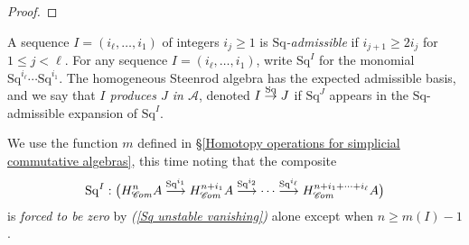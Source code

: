 \documentclass[11pt]{amsart} \renewcommand{\baselinestretch}{1.2}
\theoremstyle{plain}
\numberwithin{equation}{section} %
\theoremstyle{plain}
\numberwithin{equation}{chapter} %
\renewcommand{\to}{\longrightarrow}
\newcommand{\scrC}{\mathscr{C}}
\newcommand{\calA}{\mathcal{A}}
\newcommand{\minDimDelta}{m}
\newcommand{\produces}[3]{#3:#1\sim #2}
\renewcommand{\produces}[3]{#1\rightarrow_{#3} #2}%
\renewcommand{\produces}[3]{#1\overset{\smash{#3}}{\rightarrow} #2}%
\newcommand{\Sq}{\mathrm{Sq}}
\newcommand{\LieSteen}{\calA}
\newcommand{\algs}{{\scrC\!\textit{\normalfont\textit{om}}}}
\begin{document}
\begin{Constructing cohomology operations}
\begin{proof}
\end{proof}
A sequence $I=(i_\ell,\ldots,i_1)$ of integers $i_j\geq1$ is \emph{$\Sq$-admissible} if $i_{j+1}\geq 2i_j$ for $1\leq j <\ell$. For any sequence $I=(i_\ell,\ldots,i_1)$, write $\Sq^I$ for the monomial $\Sq^{i_\ell}\cdots \Sq^{i_1}$. The homogeneous Steenrod algebra has the expected admissible basis, and we say that \emph{$I$ produces $J$ in $\LieSteen$}, denoted $\produces{I}{J}{\Sq}$ if $\Sq^J$ appears in the $\Sq$-admissible expansion of $\Sq^I$.

We use the function $\minDimDelta$ defined in \S\ref{Homotopy operations for simplicial commutative algebras}, this time  noting that the composite 
\[\Sq^I:\bigl(H_{\algs}^{n}A\overset{\Sq^{i_1}}{\to}H_{\algs}^{n+i_1}A\overset{\Sq^{i_2}}{\to}\cdots \overset{\Sq^{i_\ell}}{\to}H_{\algs}^{n+i_1+\cdots +i_\ell}A\bigr)\]
is \emph{forced to be zero} by \emph{(\ref{Sq unstable vanishing})} alone except  when $n\geq\minDimDelta(I)-1$.



\end{Constructing cohomology operations}
\end{document}
